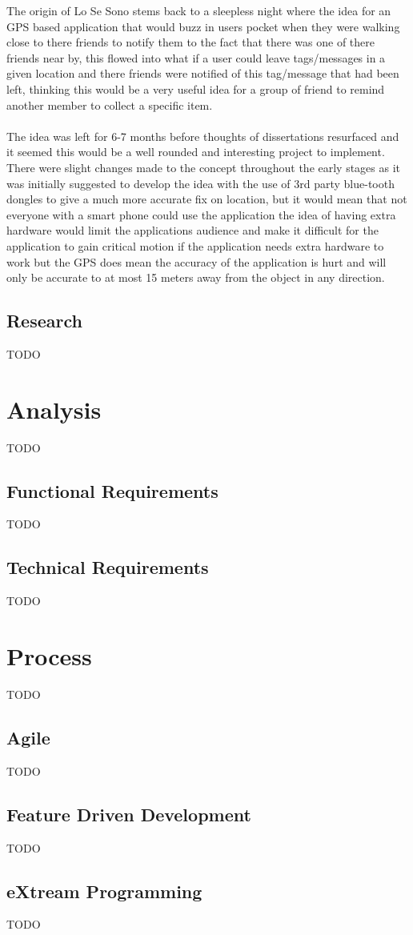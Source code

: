 The origin of Lo Se Sono stems back to a sleepless night where the idea for an GPS based application that would buzz in users pocket when they were walking close to there friends to notify them to the fact that there was one of there friends near by, this flowed into what if a user could leave tags/messages in a given location and there friends were notified of this tag/message that had been left, thinking this would be a very useful idea for a group of friend to remind another member to collect a specific item.\\
\\
The idea was left for 6-7 months before thoughts of dissertations resurfaced and it seemed this would be a well rounded and interesting project to implement. There were slight changes made to the concept throughout the early stages as it was initially suggested to develop the idea with the use of 3rd party blue-tooth dongles to give a much more accurate fix on location, but it would mean that not everyone with a smart phone could use the application the idea of having extra hardware would limit the applications audience and make it difficult for the application to gain critical motion if the application needs extra hardware to work but the GPS does mean the accuracy of the application is hurt and will only be accurate to at most 15 meters away from the object in any direction.

\subsection{Research}

{TODO}


\section{Analysis}

{TODO}

\subsection{Functional Requirements}

{TODO}

\subsection{Technical Requirements}

{TODO}


\section{Process}

{TODO}

\subsection{Agile}

{TODO}

\subsection{Feature Driven Development}

{TODO}

\subsection{eXtream Programming}

{TODO}